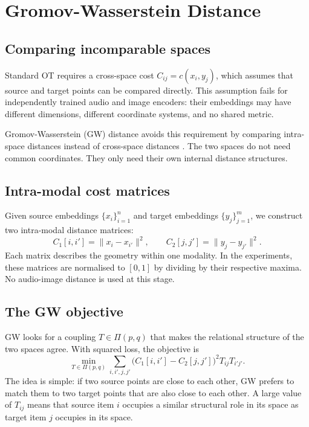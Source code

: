 \section{Gromov-Wasserstein Distance}
\label{sec:gw}

\subsection{Comparing incomparable spaces}

Standard OT requires a cross-space cost $C_{ij}=c(x_i,y_j)$, which assumes that source and target points can be compared directly. This assumption fails for independently trained audio and image encoders: their embeddings may have different dimensions, different coordinate systems, and no shared metric.

Gromov-Wasserstein (GW) distance avoids this requirement by comparing intra-space distances instead of cross-space distances \cite{memoli2011gromov,peyre2016gromov}. The two spaces do not need common coordinates. They only need their own internal distance structures.

\subsection{Intra-modal cost matrices}

Given source embeddings $\{x_i\}_{i=1}^n$ and target embeddings $\{y_j\}_{j=1}^m$, we construct two intra-modal distance matrices:
\[
C_1[i,i'] = \|x_i - x_{i'}\|^2,
\qquad
C_2[j,j'] = \|y_j - y_{j'}\|^2.
\]
Each matrix describes the geometry within one modality. In the experiments, these matrices are normalised to $[0,1]$ by dividing by their respective maxima. No audio-image distance is used at this stage.

\subsection{The GW objective}

GW looks for a coupling $T \in \Pi(p,q)$ that makes the relational structure of the two spaces agree. With squared loss, the objective is
\[
\min_{T \in \Pi(p,q)}
\sum_{i,i',j,j'}
\big(C_1[i,i'] - C_2[j,j']\big)^2
T_{ij}T_{i'j'}.
\]
The idea is simple: if two source points are close to each other, GW prefers to match them to two target points that are also close to each other. A large value of $T_{ij}$ means that source item $i$ occupies a similar structural role in its space as target item $j$ occupies in its space.

